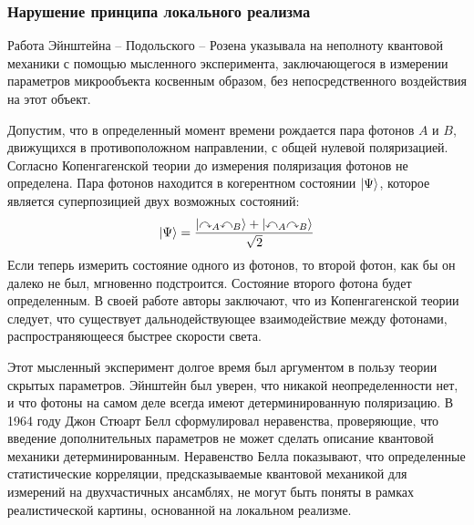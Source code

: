 
\subsubsection{Нарушение принципа локального реализма}
Работа Эйнштейна -- Подольского -- Розена\cite{Einstein1935}
указывала на неполноту квантовой механики с помощью мысленного эксперимента,
заключающегося в измерении параметров микрообъекта косвенным образом,
без непосредственного воздействия на этот объект.

Допустим, что в определенный момент времени рождается пара фотонов $A$ и $B$,
движущихся в противоположном направлении,
с общей нулевой поляризацией.
Согласно Копенгагенской теории до измерения поляризация фотонов не определена.
Пара фотонов находится в когерентном состоянии $\left| \Psi \right\rangle$,
которое является суперпозицией двух возможных состояний:
\begin{equation}\label{eq:entangled-state}
  \left| \Psi \right\rangle = \dfrac{
    \left| \curvearrowright_A \curvearrowleft_B \right\rangle
    + \left| \curvearrowleft_A \curvearrowright_B \right\rangle
  }{\sqrt{2}}
\end{equation}
Если теперь измерить состояние одного из фотонов,
то второй фотон,
как бы он далеко не был,
мгновенно подстроится.
Состояние второго фотона будет определенным.
В своей работе\cite{Einstein1935} авторы заключают,
что из Копенгагенской теории следует,
что существует дальнодействующее взаимодействие между фотонами,
распространяющееся быстрее скорости света.

Этот мысленный эксперимент долгое время был аргументом
в пользу теории скрытых параметров.
Эйнштейн был уверен,
что никакой неопределенности нет,
и что фотоны на самом деле всегда имеют детерминированную поляризацию.
В 1964 году Джон Стюарт Белл сформулировал неравенства\cite{Bell1964},
проверяющие,
что введение дополнительных параметров не может сделать описание квантовой механики детерминированным.
Неравенство Белла показывают,
что определенные статистические корреляции,
предсказываемые квантовой механикой для измерений на двухчастичных ансамблях,
не могут быть поняты в рамках реалистической картины,
основанной на локальном реализме\cite{Einstein1935}.


